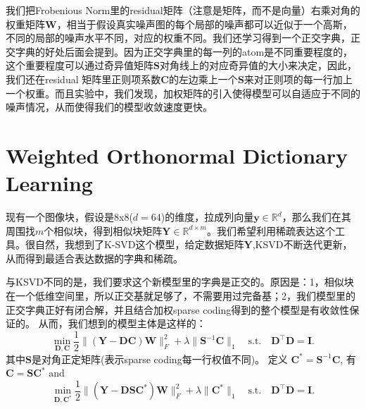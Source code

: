 \documentclass[10pt,twocolumn,letterpaper]{article}
\begin{document}
我们把Frobenious Norm里的residual矩阵（注意是矩阵，而不是向量）右乘对角的权重矩阵$\mathbf{W}$，相当于假设真实噪声图的每个局部的噪声都可以近似于一个高斯，不同的局部的噪声水平不同，对应的权重不同。我们还学习得到一个正交字典，正交字典的好处后面会提到。因为正交字典里的每一列的atom是不同重要程度的，这个重要程度可以通过奇异值矩阵$\mathbf{S}$对角线上的对应奇异值的大小来决定，因此，我们还在residual 矩阵里正则项系数$\mathbf{C}$的左边乘上一个$\mathbf{S}$来对正则项的每一行加上一个权重。而且实验中，我们发现，加权矩阵的引入使得模型可以自适应于不同的噪声情况，从而使得我们的模型收敛速度更快。

\section{Weighted Orthonormal Dictionary Learning}
现有一个图像块，假设是8x8($d=64$)的维度，拉成列向量$\mathbf{y}\in\mathbb{R}^{d}$，那么我们在其周围找$m$个相似块，得到相似块矩阵$\mathbf{Y}\in\mathbb{R}^{d\times m}$。我们希望利用稀疏表达这个工具。很自然，我想到了K-SVD这个模型，给定数据矩阵$\mathbf{Y}$,KSVD不断迭代更新，从而得到最适合表达数据的字典和稀疏。

与KSVD不同的是，我们要求这个新模型里的字典是正交的。原因是：1，相似块在一个低维空间里，所以正交基就足够了，不需要用过完备基；2，我们模型里的正交字典正好有闭合解，并且结合加权sparse coding得到的整个模型是有收敛性保证的。
从而，我们想到的模型主体是这样的：
\begin{equation}\label{wlswsc}
\min_{\mathbf{D},\mathbf{C}}\frac{1}{2}\|(\mathbf{Y}-\mathbf{D}\mathbf{C})\mathbf{W}\|_{F}^{2}
+
\lambda\|\mathbf{S}^{-1}\mathbf{C}\|_{1}
\quad
\text{s.t.}
\quad
\mathbf{D}^{\top}\mathbf{D} =\mathbf{I}. 
\end{equation}
其中$\mathbf{S}$是对角正定矩阵(表示sparse coding每一行权值不同)。
定义 $\mathbf{C}^{*}=\mathbf{S}^{-1}\mathbf{C}$, 有$\mathbf{C}=\mathbf{S}\mathbf{C}^{*}$ and 
\begin{equation}
\min_{\mathbf{D},\mathbf{C}^{*}}\frac{1}{2}\|(\mathbf{Y}-\mathbf{D}\mathbf{S}\mathbf{C}^{*})\mathbf{W}\|_{F}^{2} 
+
\lambda\|\mathbf{C}^{*}\|_{1}
\quad
\text{s.t.}
\quad
\mathbf{D}^{\top}\mathbf{D} = \mathbf{I}.
\end{equation}
\end{document}
